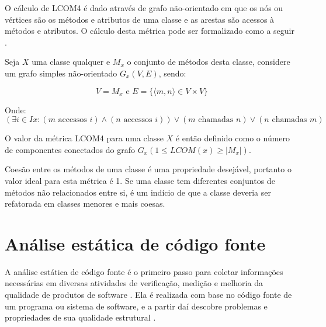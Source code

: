 \begin{itemize}
O cálculo de LCOM4 é dado através de grafo não-orientado em que os nós ou
vértices são os métodos e atributos de uma classe e as arestas são acessos à
métodos e atributos. O cálculo desta métrica pode ser formalizado como a
seguir \cite{Silva2012}.

Seja $ X $ uma classe qualquer e $ M_x $ o conjunto de métodos desta classe,
considere um grafo simples não-orientado $ G_x(V, E) $, sendo:

\begin{equation}
V = M_x
\text{ e }
E = \{ \langle m, n \rangle \in V \times V \}
\end{equation}

Onde:
\begin{equation}
(\exists i \in Ix : (m \text{ accessos } i) \land (n \text{ accessos } i)) \lor (m \text{ chamadas } n) \lor (n \text{ chamadas } m)
\end{equation}

O valor da métrica LCOM4 para uma classe $ X $ é então definido como o número
de componentes conectados do grafo $ G_x (1 \leq LCOM(x) \geq | M_x |)$.

Coesão entre os métodos de uma classe é uma propriedade desejável, portanto o
valor ideal para esta métrica é 1. Se uma classe tem diferentes conjuntos de
métodos não relacionados entre si, é um indício de que a classe deveria ser
refatorada em classes menores e mais coesas.

\end{itemize}

%
%
%

\section{Análise estática de código fonte} \label{analise-estatica}

%
%
%


A análise estática de código fonte é o primeiro passo para coletar informações
necessárias em diversas atividades de verificação, medição e melhoria da
qualidade de produtos de software \cite{Cruz2009, Kirkov2010}. Ela é
realizada com base no código fonte de um programa ou sistema de software, e a
partir daí descobre problemas e propriedades de sua qualidade estrutural
\cite{Chess2007}.

